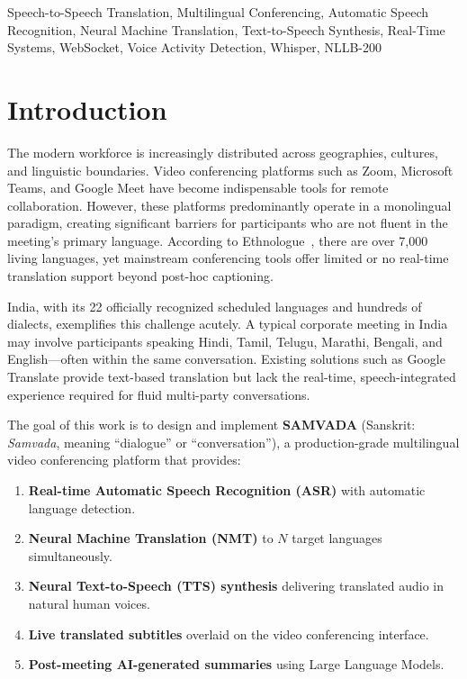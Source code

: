 \documentclass[conference]{IEEEtran}
\begin{document}
\begin{IEEEkeywords}
Speech-to-Speech Translation, Multilingual Conferencing, Automatic Speech Recognition, Neural Machine Translation, Text-to-Speech Synthesis, Real-Time Systems, WebSocket, Voice Activity Detection, Whisper, NLLB-200
\end{IEEEkeywords}

\section{Introduction}

The modern workforce is increasingly distributed across geographies, cultures, and linguistic boundaries. Video conferencing platforms such as Zoom, Microsoft Teams, and Google Meet have become indispensable tools for remote collaboration. However, these platforms predominantly operate in a monolingual paradigm, creating significant barriers for participants who are not fluent in the meeting's primary language. According to Ethnologue~\cite{ethnologue}, there are over 7,000 living languages, yet mainstream conferencing tools offer limited or no real-time translation support beyond post-hoc captioning.

India, with its 22 officially recognized scheduled languages and hundreds of dialects, exemplifies this challenge acutely. A typical corporate meeting in India may involve participants speaking Hindi, Tamil, Telugu, Marathi, Bengali, and English---often within the same conversation. Existing solutions such as Google Translate provide text-based translation but lack the real-time, speech-integrated experience required for fluid multi-party conversations.

The goal of this work is to design and implement \textbf{SAMVADA} (Sanskrit: \textit{Samvada}, meaning ``dialogue'' or ``conversation''), a production-grade multilingual video conferencing platform that provides:

\begin{enumerate}
  \item \textbf{Real-time Automatic Speech Recognition (ASR)} with automatic language detection.
  \item \textbf{Neural Machine Translation (NMT)} to $N$ target languages simultaneously.
  \item \textbf{Neural Text-to-Speech (TTS) synthesis} delivering translated audio in natural human voices.
  \item \textbf{Live translated subtitles} overlaid on the video conferencing interface.
  \item \textbf{Post-meeting AI-generated summaries} using Large Language Models.
\end{enumerate}
\end{document}
